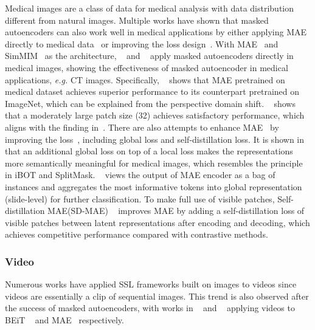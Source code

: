 \documentclass[10pt,journal,compsoc]{IEEEtran}
\begin{document}
Medical images are a class of data for medical analysis with data distribution different from natural images. Multiple works have shown that masked autoencoders can also work well in medical applications by either applying MAE directly to medical data~\cite{zhou2022self,chen2022masked} or improving the loss design~\cite{ly2022student,quan2022global,an2022masked,luo2022self}. With MAE~\cite{he2022masked} and SimMIM~\cite{xie2022simmim} as the architecture, ~\cite{zhou2022self} and ~\cite{chen2022masked} apply masked autoencoders directly in medical images, showing the effectiveness of masked autoencoder in medical applications, \textit{e.g.} CT images. Specifically, ~\cite{zhou2022self} shows that MAE pretrained on medical dataset achieves superior performance to its counterpart pretrained on ImageNet, which can be explained from the perspective domain shift. ~\cite{chen2022masked} shows that a moderately large patch size (32) achieves satisfactory performance, which aligns with the finding in~\cite{xie2022simmim}. There are also attempts to enhance MAE~\cite{he2022masked} by improving the loss~\cite{ly2022student,quan2022global,an2022masked,luo2022self}, including global loss and self-distillation loss. It is shown in~\cite{ly2022student,quan2022global} that an additional global loss on top of a local loss makes the representations more semantically meaningful for medical images, which resembles the principle in iBOT and SplitMask. ~\cite{an2022masked} views the output of MAE encoder as a bag of instances and aggregates the most informative tokens into global representation (slide-level) for further classification. To make full use of visible patches, Self-distillation MAE(SD-MAE) ~\cite{luo2022self} improves MAE by adding a self-distillation loss of visible patches between latent representations after encoding and decoding, which achieves competitive performance compared with contrastive methods. 

\subsubsection{Video}
Numerous works have applied SSL frameworks built on images to videos since videos are essentially a clip of sequential images. This trend is also observed after the success of masked autoencoders, with works in ~\cite{wang2022bevt,tan2021vimpac,wei2022masked} and  ~\cite{tong2022videomae,girdhar2022omnimae} applying videos to BEiT ~\cite{bao2022beit} and MAE~\cite{he2022masked} respectively. 
\end{document}
